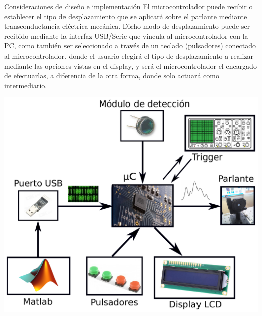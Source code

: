 \documentclass[mathserif]{beamer} %
\begin{document}
\begin{frame}
\begin{columns}[T]
\begin{column}{.475\linewidth}
                \begin{block}{Consideraciones de diseño e implementación}
			\justifying
             El microcontrolador puede recibir o establecer el tipo de desplazamiento que se aplicará sobre el parlante mediante transconductancia eléctrica-mecánica. Dicho modo de desplazamiento puede ser recibido mediante la interfaz USB/Serie que vincula al microcontrolador con la PC, como también ser seleccionado a través de un teclado (pulsadores) conectado al microcontrolador, donde el usuario elegirá el tipo de desplazamiento a realizar mediante las opciones vistas en el display, y será el microcontrolador el encargado de efectuarlas, a diferencia de la otra forma, donde solo actuará como intermediario.
                      \begin{center}
                        \includegraphics[width=0.9\linewidth]{img/diagrama_de_bloques.pdf}
                      \end{center}
                \end{block}


\end{column}
\end{columns}
\end{frame}
\end{document}
